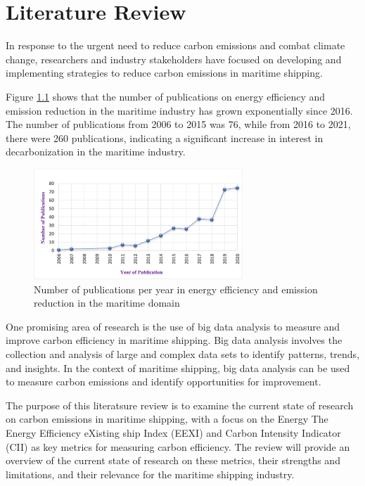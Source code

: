 \chapter{Literature Review}

In response to the urgent need to reduce carbon emissions and combat climate change, researchers and industry stakeholders have focused on developing and implementing strategies to reduce carbon emissions in maritime shipping.

Figure \ref{publicationRate} shows that the number of publications on energy efficiency and emission reduction in the maritime industry has grown exponentially since 2016. The number of publications from 2006 to 2015 was 76, while from 2016 to 2021, there were 260 publications, indicating a significant increase in interest in decarbonization in the maritime industry.
\autocite{JIMENEZ2022132888}

\begin{figure}[h]
    \centering
    \includegraphics[width=0.7\textwidth]{images/publication_rate.jpg}
    \caption{Number of publications per year in energy efficiency and emission reduction in the maritime domain}
    \label{publicationRate}
\end{figure}

One promising area of research is the use of big data analysis to measure and improve carbon efficiency in maritime shipping. Big data analysis involves the collection and analysis of large and complex data sets to identify patterns, trends, and insights. In the context of maritime shipping, big data analysis can be used to measure carbon emissions and identify opportunities for improvement.

The purpose of this literatsure review is to examine the current state of research on carbon emissions in maritime shipping, with a focus on the Energy The Energy Efficiency eXisting ship Index (EEXI) and Carbon Intensity Indicator (CII) as key metrics for measuring carbon efficiency. The review will provide an overview of the current state of research on these metrics, their strengths and limitations, and their relevance for the maritime shipping industry.

